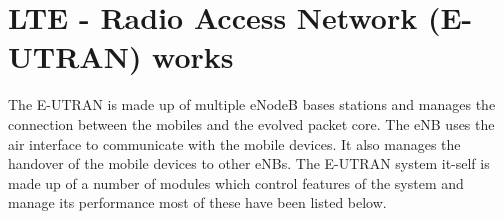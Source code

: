 \section{LTE - Radio Access Network (E-UTRAN) works}
{
    The E-UTRAN is made up of multiple eNodeB bases stations and manages the connection between the mobiles and the evolved packet core. The eNB uses the air interface to communicate with the mobile devices. It also manages the handover of the mobile devices to other eNBs\cite{tutorialspoint2018}. The E-UTRAN system it-self is made up of a number of modules which control features of the system and manage its performance most of these have been listed below.
}